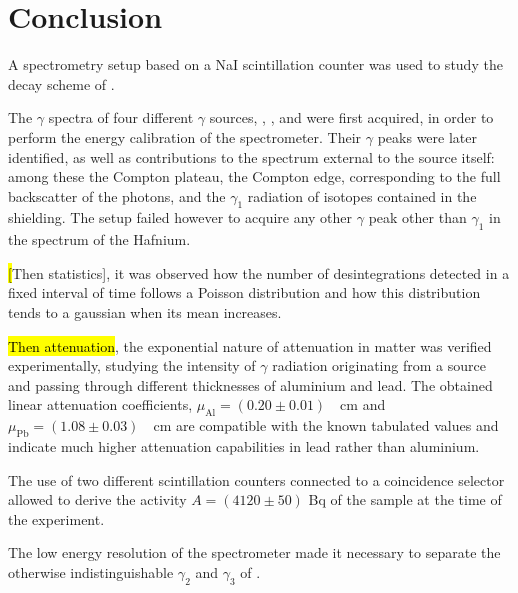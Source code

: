 \section{Conclusion}
A spectrometry setup based on a NaI scintillation counter was used to study the decay scheme of \cobalt.

The $\gamma$ spectra of four different $\gamma$ sources, \cesium, \cobalt, \lead and \hafnium were first acquired, in order to perform the energy calibration of the spectrometer.
Their $\gamma$ peaks were later identified, as well as contributions to the spectrum external to the source itself:
among these the Compton plateau, the Compton edge, corresponding to the full backscatter of the photons, and the $\gamma_1$ radiation of \lead isotopes contained in the shielding.
The setup failed however to acquire any other $\gamma$ peak other than $\gamma_1$ in the spectrum of the Hafnium.

\hl[Then statistics], it was observed how the number of desintegrations detected in a fixed interval of time follows a Poisson distribution and how this distribution tends to a gaussian when its mean increases.

\hl{Then attenuation}, the exponential nature of attenuation in matter was verified experimentally, studying the intensity of $\gamma$ radiation originating from a \cesium source and passing through different thicknesses of aluminium and lead.
The obtained linear attenuation coefficients, \mbox{$\mu_{\mathrm{Al}} = (0.20 \pm 0.01)$ \unit{\per\cm}} and \mbox{$\mu_{\mathrm{Pb}} = (1.08 \pm 0.03)$ \unit{\per\cm}} are compatible with the known tabulated values and indicate much higher attenuation capabilities in lead rather than aluminium.

The use of two different scintillation counters connected to a coincidence selector allowed to derive the activity $A = (4120 \pm 50)$ Bq of the \cobalt sample at the time of the experiment.

The low energy resolution of the spectrometer made it necessary to separate the otherwise indistinguishable $\gamma_2$ and $\gamma_3$ of \cobalt.